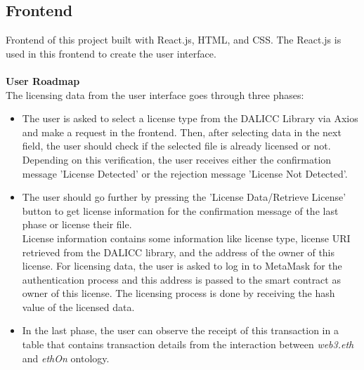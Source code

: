\subsection{Frontend}
Frontend of this project built with React.js, HTML, and CSS. The React.js is used in this frontend to create the user interface.\\
\\
\textbf{User Roadmap}\\
The licensing data from the user interface goes through three phases:
\begin{itemize}
	\item The user is asked to select a license type from the DALICC Library via Axios and make a request in the frontend. Then, after selecting data in the next field, the user should check if the selected file is already licensed or not. Depending on this verification, the user receives either the confirmation message 'License Detected' or the rejection message 'License Not Detected'.
   \item The user should go further by pressing the 'License Data/Retrieve License' button to get license information for the confirmation message of the last phase or license their file.\\
    License information contains some information like license type, license URI retrieved from the DALICC library, and the address of the owner of this license. For licensing data, the user is asked to log in to MetaMask for the authentication process and this address is passed to the smart contract as owner of this license. The licensing process is done by receiving the hash value of the licensed data.
   \item In the last phase, the user can observe the receipt of this transaction in a table that contains transaction details from the interaction between \textit{web3.eth} and \textit{ethOn} ontology.
 \end{itemize}
